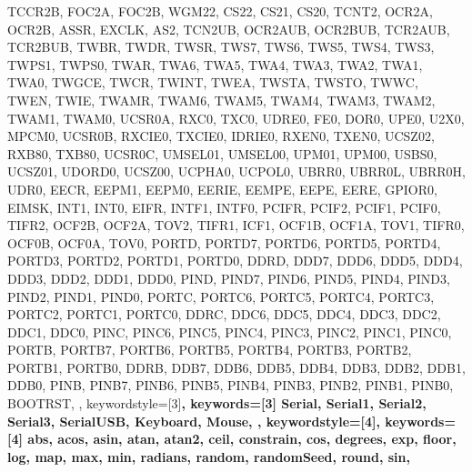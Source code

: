 {{                TCCR2B, FOC2A, FOC2B, WGM22, CS22, CS21, CS20,
                TCNT2, OCR2A, OCR2B,
                ASSR, EXCLK, AS2, TCN2UB, OCR2AUB, OCR2BUB, TCR2AUB, TCR2BUB,
                TWBR, TWDR,
                TWSR, TWS7, TWS6, TWS5, TWS4, TWS3, TWPS1, TWPS0,
                TWAR, TWA6, TWA5, TWA4, TWA3, TWA2, TWA1, TWA0, TWGCE,
                TWCR, TWINT, TWEA, TWSTA, TWSTO, TWWC, TWEN, TWIE,
                TWAMR, TWAM6, TWAM5, TWAM4, TWAM3, TWAM2, TWAM1, TWAM0,
                UCSR0A, RXC0, TXC0, UDRE0, FE0, DOR0, UPE0, U2X0, MPCM0,
                UCSR0B, RXCIE0, TXCIE0, IDRIE0, RXEN0, TXEN0, UCSZ02, RXB80, TXB80,
                UCSR0C, UMSEL01, UMSEL00, UPM01, UPM00, USBS0, UCSZ01, UDORD0, UCSZ00, UCPHA0, UCPOL0,
                UBRR0, UBRR0L, UBRR0H,
                UDR0,
                EECR, EEPM1, EEPM0, EERIE, EEMPE, EEPE, EERE,
                GPIOR0,
                EIMSK, INT1, INT0,
                EIFR, INTF1, INTF0,
                PCIFR, PCIF2, PCIF1, PCIF0,
                TIFR2, OCF2B, OCF2A, TOV2, 
                TIFR1, ICF1, OCF1B, OCF1A, TOV1, 
                TIFR0, OCF0B, OCF0A, TOV0, 
                PORTD, PORTD7, PORTD6, PORTD5, PORTD4, PORTD3, PORTD2, PORTD1, PORTD0, 
                DDRD, DDD7, DDD6, DDD5, DDD4, DDD3, DDD2, DDD1, DDD0, 
                PIND, PIND7, PIND6, PIND5, PIND4, PIND3, PIND2, PIND1, PIND0, 
                PORTC, PORTC6, PORTC5, PORTC4, PORTC3, PORTC2, PORTC1, PORTC0, 
                DDRC, DDC6, DDC5, DDC4, DDC3, DDC2, DDC1, DDC0, 
                PINC, PINC6, PINC5, PINC4, PINC3, PINC2, PINC1, PINC0, 
                PORTB, PORTB7, PORTB6, PORTB5, PORTB4, PORTB3, PORTB2, PORTB1, PORTB0, 
                DDRB, DDB7, DDB6, DDB5, DDB4, DDB3, DDB2, DDB1, DDB0, 
                PINB, PINB7, PINB6, PINB5, PINB4, PINB3, PINB2, PINB1, PINB0, 
                BOOTRST,
                },  
% 
%
  keywordstyle=[3]\bfseries\color{arduinoOrange},
  keywords=[3]{  %
                Serial, Serial1, Serial2, Serial3, SerialUSB, Keyboard, Mouse,
                },      
%
%
  keywordstyle=[4]\color{arduinoOrange},
  keywords=[4]{  %
                abs, acos, asin, atan, atan2, ceil, constrain, cos, degrees, exp, 
                floor, log, map, max, min, radians, random, randomSeed, round, sin, 
}}
